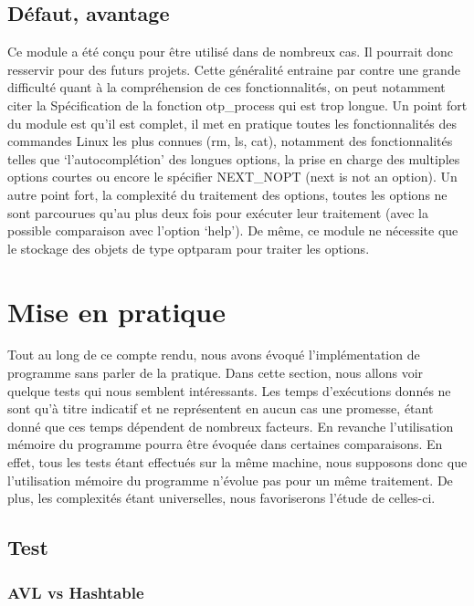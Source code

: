 \documentclass[12pt]{article}
\begin{document}
    \subsection{Défaut, avantage}

    Ce module a été conçu pour être utilisé dans de nombreux cas. Il pourrait 
    donc resservir pour des futurs projets. Cette généralité entraine par contre 
    une grande difficulté quant à la compréhension de ces fonctionnalités, on 
    peut notamment citer la Spécification de la fonction otp\_process qui est 
    trop longue.
    Un point fort du module est qu'il est complet, il met en pratique toutes les 
    fonctionnalités des commandes Linux les plus connues (rm, ls, cat), notamment 
    des fonctionnalités telles que `l'autocomplétion' des longues options, la 
    prise en charge des multiples options courtes ou encore le spécifier 
    NEXT\_NOPT (next is not an option). Un autre point fort, la complexité du 
    traitement des options, toutes les options ne sont parcourues qu'au plus 
    deux fois pour exécuter leur traitement (avec la possible comparaison avec 
    l'option `help'). De même, ce module ne nécessite que le stockage des objets 
    de type optparam pour traiter les options.

    \section{Mise en pratique}\label{test}

    Tout au long de ce compte rendu, nous avons évoqué l'implémentation de 
    programme sans parler de la pratique. Dans cette section, nous allons voir
    quelque tests qui nous semblent intéressants.
    Les temps d'exécutions donnés ne sont qu'à titre indicatif et ne 
    représentent en aucun cas une promesse, étant donné que ces temps dépendent de 
    nombreux facteurs. En revanche l'utilisation mémoire du programme pourra 
    être évoquée dans certaines comparaisons. En effet, tous les tests étant 
    effectués sur la même machine, nous supposons donc que l'utilisation mémoire 
    du programme n'évolue pas pour un même traitement. De plus, les complexités 
    étant universelles, nous favoriserons l'étude de celles-ci.

    \subsection{Test}

    \subsubsection{AVL vs Hashtable}\label{avl-has}
\end{document}
